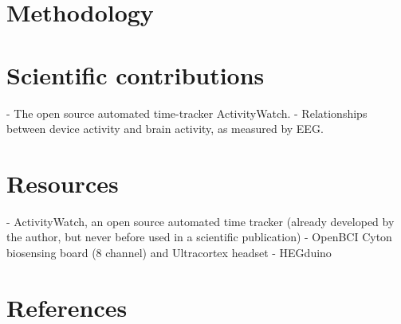 \documentclass{IEEEtran}
\begin{document}
\section{Methodology}

\section{Scientific contributions}
\begin{markdown}

 - The open source automated time-tracker ActivityWatch.
 - Relationships between device activity and brain activity, as measured by EEG.

\end{markdown}

\section{Resources}
\begin{markdown}

 - ActivityWatch, an open source automated time tracker (already developed by the author, but never before used in a scientific publication)
 - OpenBCI Cyton biosensing board (8 channel) and Ultracortex headset
 - HEGduino

\end{markdown}


\section{References}

\nocite{*}
\printbibliography{}
\end{document}
